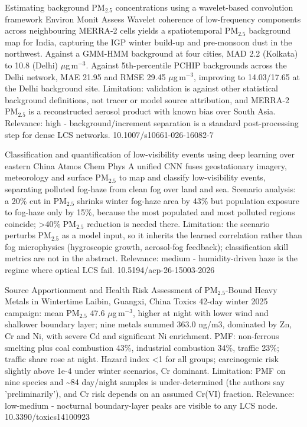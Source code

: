 \documentclass[10pt]{article}
\begin{document}
\par{}\baselineskip{}\baselineskip
{}

{Estimating background PM$_{2.5}$ concentrations using a wavelet-based convolution framework}
{Environ Monit Assess}
{Wavelet coherence of low-frequency components across neighbouring MERRA-2 cells yields a spatiotemporal PM$_{2.5}$ background map for India, capturing the IGP winter build-up and pre-monsoon dust in the northwest. Against a GMM-HMM background at four cities, MAD 2.2 (Kolkata) to 10.8 (Delhi) $\mu$g\,m$^{-3}$. Against 5th-percentile PCHIP backgrounds across the Delhi network, MAE 21.95 and RMSE 29.45 $\mu$g\,m$^{-3}$, improving to 14.03/17.65 at the Delhi background site. Limitation: validation is against other statistical background definitions, not tracer or model source attribution, and MERRA-2 PM$_{2.5}$ is a reconstructed aerosol product with known bias over South Asia. Relevance: high - background/increment separation is a standard post-processing step for dense LCS networks.}
{10.1007/s10661-026-16082-7}

{Classification and quantification of low-visibility events using deep learning over eastern China}
{Atmos Chem Phys}
{A unified CNN fuses geostationary imagery, meteorology and surface PM$_{2.5}$ to map and classify low-visibility events, separating polluted fog-haze from clean fog over land and sea. Scenario analysis: a 20\% cut in PM$_{2.5}$ shrinks winter fog-haze area by 43\% but population exposure to fog-haze only by 15\%, because the most populated and most polluted regions coincide; >40\% PM$_{2.5}$ reduction is needed there. Limitation: the scenario perturbs PM$_{2.5}$ as a model input, so it inherits the learned correlation rather than fog microphysics (hygroscopic growth, aerosol-fog feedback); classification skill metrics are not in the abstract. Relevance: medium - humidity-driven haze is the regime where optical LCS fail.}
{10.5194/acp-26-15003-2026}

{Source Apportionment and Health Risk Assessment of PM$_{2.5}$-Bound Heavy Metals in Wintertime Laibin, Guangxi, China}
{Toxics}
{42-day winter 2025 campaign: mean PM$_{2.5}$ 47.6 $\mu$g\,m$^{-3}$, higher at night with lower wind and shallower boundary layer; nine metals summed 363.0 ng/m3, dominated by Zn, Cr and Ni, with severe Cd and significant Ni enrichment. PMF: non-ferrous smelting plus coal combustion 43\%, industrial combustion 34\%, traffic 23\%; traffic share rose at night. Hazard index <1 for all groups; carcinogenic risk slightly above 1e-4 under winter scenarios, Cr dominant. Limitation: PMF on nine species and \textasciitilde{}84 day/night samples is under-determined (the authors say 'preliminarily'), and Cr risk depends on an assumed Cr(VI) fraction. Relevance: low-medium - nocturnal boundary-layer peaks are visible to any LCS node.}
{10.3390/toxics14100923}
\end{document}
